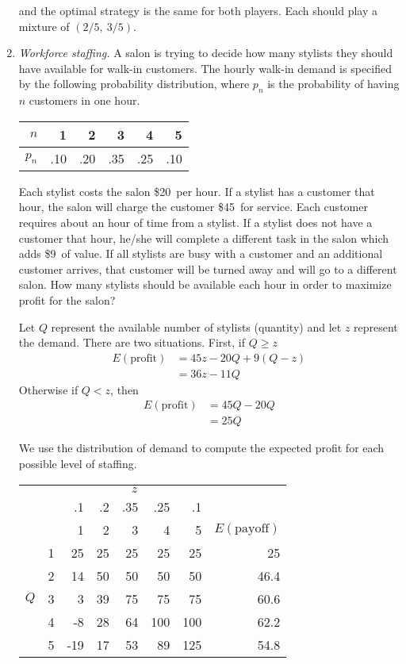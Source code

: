\begin{enumerate}
\begin{solution}
and the optimal strategy is the same for both players. Each
should play a mixture of $(2/5,~3/5)$.
\end{solution}

\item \emph{Workforce staffing.}  A salon is trying to decide how many
  stylists they should have available for walk-in customers. The
  hourly walk-in demand is specified by the following probability
  distribution, where $p_n$ is the probability of having $n$ customers
  in one hour.

\vspace{.2in}
\begin{tabular}{r|rrrrr}
$n$ & 1 & 2 & 3 & 4 & 5 \\ \hline
$p_n$ & .10 & .20 & .35 & .25 & .10 \\
\end{tabular}

\vspace{.2in} Each stylist costs the salon \$20\ per hour.  If a
stylist has a customer that hour, the salon will charge the customer
\$45\ for service.  Each customer requires about an hour of time from
a stylist.  If a stylist does not have a customer that hour, he/she
will complete a different task in the salon which adds \$9\ of
value. If all stylists are busy with a customer and an additional
customer arrives, that customer will be turned away and will go to a
different salon. How many stylists should be available each hour in
order to maximize profit for the salon?

\begin{solution}
  \bs Let $Q$ represent the available number of stylists (quantity)
  and let $z$ represent the demand. There are two situations.  First,
  if $Q \geq z$
\begin{align*}
E(\text{profit}) &= 45z - 20Q + 9(Q-z) \\
&= 36z - 11Q
\end{align*}
Otherwise if $Q < z$, then
\begin{align*}
E(\text{profit}) &= 45Q - 20Q\\
&= 25Q
\end{align*}

We use the distribution of demand to compute the expected profit
for each possible level of staffing.
\begin{center}
\begin{tabular}{rr|rrrrrr}
& & \multicolumn{5}{c}{$z$} & \\
& & .1 & .2 & .35 & .25 & .1 & \\
& & 1 & 2 & 3 & 4 & 5 &  $E(\text{payoff})$ \\ \hline
\multirow{5}{*}{$Q$} & 1 & 25 & 25 & 25 & 25 & 25 & 25 \\
& 2 & 14 & 50 & 50 & 50 & 50 & 46.4 \\
& 3 & 3 & 39 & 75 & 75 & 75 & 60.6 \\
& 4 & -8 & 28 & 64 & 100 & 100 & 62.2 \\
& 5 & -19 & 17 & 53 & 89 & 125 & 54.8
\end{tabular}
\end{center}


\end{solution}
\end{enumerate}

